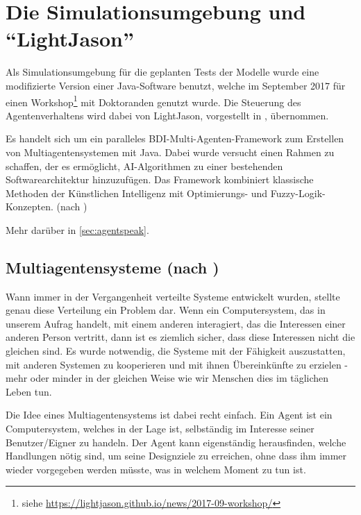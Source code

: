 \section{Die Simulationsumgebung und \enquote{LightJason}}
\label{sec:simulationsumgebung}

Als Simulationsumgebung für die geplanten Tests der Modelle wurde eine modifizierte Version einer Java-Software benutzt, welche im September 2017 für einen Workshop\footnote{siehe \url{https://lightjason.github.io/news/2017-09-workshop/}} mit Doktoranden genutzt wurde.
Die Steuerung des Agentenverhaltens wird dabei von LightJason, vorgestellt in \cite{lightjason}, übernommen.

Es handelt sich um ein paralleles BDI-Multi-Agenten-Framework zum Erstellen von Multiagentensystemen mit Java. 
Dabei wurde versucht einen Rahmen zu schaffen, der es ermöglicht, AI-Algorithmen zu einer bestehenden Softwarearchitektur hinzuzufügen. 
Das Framework kombiniert klassische Methoden der Künstlichen Intelligenz mit Optimierungs- und Fuzzy-Logik-Konzepten.
(nach \cite{lightjason-web})

Mehr darüber in \cref{sec:agentspeak}.






\subsection[Multiagentensysteme]{Multiagentensysteme (nach \cite{multiagent})}
\label{sec:multiagentensysteme}

Wann immer in der Vergangenheit verteilte Systeme entwickelt wurden, stellte genau diese Verteilung ein Problem dar. 
Wenn ein Computersystem, das in unserem Aufrag handelt, mit einem anderen interagiert, das die Interessen einer anderen Person vertritt, dann ist es ziemlich sicher, dass diese Interessen nicht die gleichen sind.
Es wurde notwendig, die Systeme mit der Fähigkeit auszustatten, mit anderen Systemen zu kooperieren und mit ihnen Übereinkünfte zu erzielen - mehr oder minder in der gleichen Weise wie wir Menschen dies im täglichen Leben tun.

Die Idee eines Multiagentensystems ist dabei recht einfach.
Ein Agent ist ein Computersystem, welches in der Lage ist, selbständig im Interesse seiner Benutzer/Eigner zu handeln.
Der Agent kann eigenständig herausfinden, welche Handlungen nötig sind, um seine Designziele zu erreichen, ohne dass ihm immer wieder vorgegeben werden müsste, was in welchem Moment zu tun ist.

